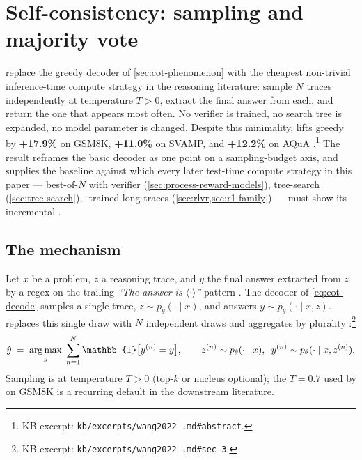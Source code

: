 
\section{Self-consistency: sampling and majority vote}
\label{sec:self-consistency}

\citet{wang2022-self-consistency} replace the greedy decoder of
\cref{sec:cot-phenomenon} with the cheapest non-trivial inference-time
compute strategy in the reasoning literature: sample $N$ 
traces independently at temperature $T > 0$, extract the final answer
from each, and return the one that appears most often. No verifier is
trained, no search tree is expanded, no model parameter is changed.
Despite this minimality,  lifts greedy  by
\textbf{+17.9\%} on GSM8K, \textbf{+11.0\%} on SVAMP, and \textbf{+12.2\%}
on AQuA \citep[abstract]{wang2022-self-consistency}.\footnote{KB excerpt:
\texttt{kb/excerpts/wang2022-.md\#abstract}.} The
result reframes the basic  decoder as one point on a sampling-budget
axis, and supplies the baseline against which every later test-time
compute strategy in this paper — best-of-$N$ with verifier
(\cref{sec:process-reward-models}), tree-search (\cref{sec:tree-search}),
-trained long traces (\cref{sec:rlvr,sec:r1-family}) — must show
its incremental .

\subsection{The mechanism}
\label{sec:sc-mechanism}

Let $x$ be a problem, $z$ a reasoning trace, and $y$ the final answer
extracted from $z$ by a regex on the trailing \textit{``The answer is
$\langle\cdot\rangle$''} pattern \citep[\S 3.1]{wei2022-cot}. The 
decoder of \cref{eq:cot-decode} samples a single trace, $z \sim
p_\theta(\cdot \mid x)$, and answers $y \sim p_\theta(\cdot \mid x, z)$.
 replaces this single draw with $N$ independent draws
and aggregates by plurality
\citep[\S 3]{wang2022-self-consistency}:\footnote{KB excerpt:
\texttt{kb/excerpts/wang2022-.md\#sec-3}.}
\begin{equation}
  \hat y \;=\; \argmax_y \; \sum_{n=1}^N \mathbb{1}\bigl[y^{(n)} = y\bigr],
  \qquad
  z^{(n)} \sim p_\theta(\cdot \mid x), \;\;
  y^{(n)} \sim p_\theta(\cdot \mid x, z^{(n)}).
  \label{eq:self-consistency}
\end{equation}
Sampling is at temperature $T > 0$ (top-$k$ or nucleus optional);
the  $T = 0.7$ used by \citet[\S 4.1]{wang2022-self-consistency}
on GSM8K is a recurring default in the downstream literature.

